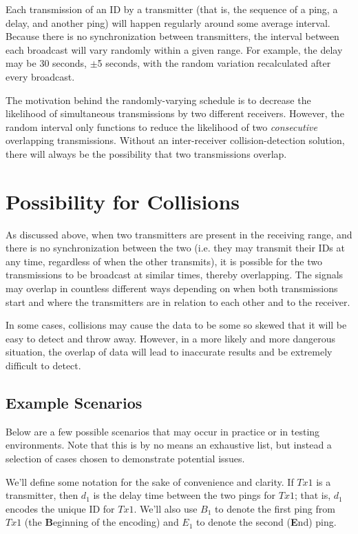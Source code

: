 \documentclass[12pt]{article}
\begin{document}
Each transmission of an ID by a transmitter (that is, the sequence of a
ping, a delay, and another ping) will happen regularly around some average
interval.
Because there is no synchronization between transmitters, the interval
between each broadcast will vary randomly within a given range.
For example, the delay may be 30 seconds, $\pm$5 seconds, with the random
variation recalculated after every broadcast.

The motivation behind the randomly-varying schedule is to decrease the
likelihood of simultaneous transmissions by two different receivers.
However, the random interval only functions to reduce the likelihood of
two \emph{consecutive} overlapping transmissions.
Without an inter-receiver collision-detection solution, there will always
be the possibility that two transmissions overlap.

\section{Possibility for Collisions}

As discussed above,
when two transmitters are present in the receiving range, and there is no
synchronization between the two (i.e. they may transmit their IDs at any
time, regardless of when the other transmits), it is possible for the two
transmissions to be broadcast at similar times, thereby overlapping.
The signals may overlap in countless different ways depending on when
both transmissions start and where the transmitters are in relation to
each other and to the receiver.

In some cases, collisions may cause the data to be some so skewed that it will
be easy to detect and throw away. However, in a more likely and more dangerous
situation, the overlap of data will lead to inaccurate results and be extremely
difficult to detect.

\subsection{Example Scenarios}

Below are a few possible scenarios that may occur in practice or in testing
environments. Note that this is by no means an exhaustive list, but instead
a selection of cases chosen to demonstrate potential issues.

We'll define some notation for the sake of convenience and clarity.
If $Tx1$ is a transmitter, then $d_1$ is the delay time between
the two pings for $Tx1$; that is, $d_1$ encodes the unique ID for $Tx1$.
We'll also use $B_1$ to denote the first ping from $Tx1$
(the {\bf B}eginning of the encoding) and $E_1$ to denote the second
({\bf E}nd) ping.
\end{document}
